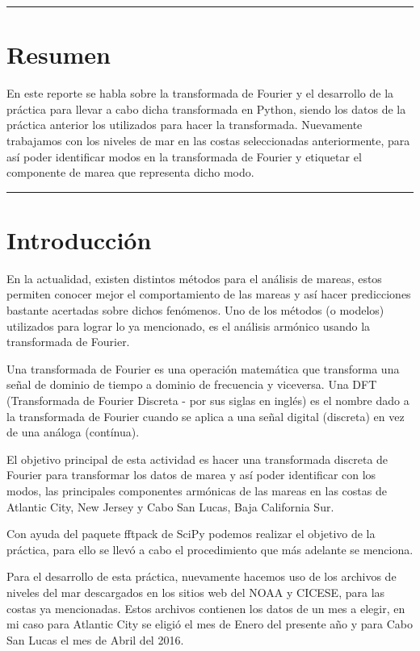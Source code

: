 \documentclass[12pt]{article}
\begin{document}
\begin{doublespace}
\hrule
\section*{Resumen}
En este reporte se habla sobre la transformada de Fourier y el desarrollo de la práctica para llevar a cabo dicha transformada en Python, siendo los datos de la práctica anterior los utilizados para hacer la transformada. Nuevamente trabajamos con los niveles de mar en las costas seleccionadas anteriormente, para así poder identificar modos en la transformada de Fourier y etiquetar el componente de marea que representa dicho modo.
\vspace{0.6 cm}
\hrule

\vspace{0.6 cm}
\section{Introducción}

En la actualidad, existen distintos métodos para el análisis de mareas, estos permiten conocer mejor el comportamiento de las mareas y así hacer predicciones bastante acertadas sobre dichos fenómenos. Uno de los métodos (o modelos) utilizados para lograr lo ya mencionado, es el análisis armónico usando la transformada de Fourier. 

Una transformada de Fourier es una operación matemática que transforma una señal de dominio de tiempo a dominio de frecuencia y viceversa. Una DFT (Transformada de Fourier Discreta - por sus siglas en inglés) es el nombre dado a la transformada de Fourier cuando se aplica a una señal digital (discreta) en vez de una análoga (contínua).

El objetivo principal de esta actividad es hacer una transformada discreta de Fourier para transformar los datos de marea y así poder identificar con los modos, las principales componentes armónicas de las mareas en las costas de Atlantic City, New Jersey y Cabo San Lucas, Baja California Sur.

Con ayuda del paquete fftpack de SciPy podemos realizar el objetivo de la práctica, para ello se llevó a cabo el procedimiento que más adelante se menciona. 

Para el desarrollo de esta práctica, nuevamente hacemos uso de los archivos de niveles del mar descargados en los sitios web del NOAA y CICESE, para las costas ya mencionadas. Estos archivos contienen los datos de un mes a elegir, en mi caso para Atlantic City se eligió el mes de Enero del presente año y para Cabo San Lucas el mes de Abril del 2016.


\end{doublespace}
\end{document}
